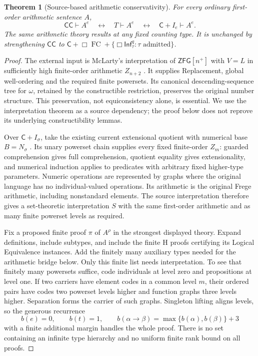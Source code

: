 \documentclass[11pt]{article}
\newcommand{\C}{\mathsf C}
\newcommand{\CC}{\mathsf{CC}}
\newcommand{\Infq}{\mathsf{Inf}^{q}}
\newtheorem{theorem}[proposition]{Theorem}
\begin{document}
\begin{theorem}[Source-based arithmetic conservativity]\label{fullconservation}
For every ordinary first-order arithmetic sentence $A$,
\[
 \CC\vdash A^e\quad\longleftrightarrow\quad
 T\vdash A^e\quad\longleftrightarrow\quad
 \C+I_e\vdash A^e.
\]
The same arithmetic theory results at any fixed counting type. It is unchanged by strengthening $\CC$ to $\C+\Box\operatorname{FC}+\{\Box\Infq_\tau:\tau\text{ admitted}\}$.
\end{theorem}
\begin{proof}
The external input is McLarty's interpretation of $\mathsf{ZFG}[n^+]$ with $V=L$ in sufficiently high finite-order arithmetic $Z_{n+2}$ \cite[\S\S2--5, pp.~2--6]{mclarty}. It supplies Replacement, global well-ordering and the required finite powersets. Its canonical descending-sequence tree for $\omega$, retained by the constructible restriction, preserves the original number structure. This preservation, not equiconsistency alone, is essential. We use the interpretation theorem as a source dependency; the proof below does not reprove its underlying constructibility lemmas.

Over $\C+I_\sigma$, take the existing current extensional quotient with numerical base $B=N_\sigma$ \cite[\S\S29,32.1,33.1]{coding}. Its unary powerset chain supplies every fixed finite-order $Z_m$: guarded comprehension gives full comprehension, quotient equality gives extensionality, and numerical induction applies to predicates with arbitrary fixed higher-type parameters. Numeric operations are represented by graphs where the original language has no individual-valued operations. Its arithmetic is the original Frege arithmetic, including nonstandard elements. The source interpretation therefore gives a set-theoretic interpretation $S$ with the same first-order arithmetic and as many finite powerset levels as required.

Fix a proposed finite proof $\pi$ of $A^\rho$ in the strongest displayed theory. Expand definitions, include subtypes, and include the finite H proofs certifying its Logical Equivalence instances. Add the finitely many auxiliary types needed for the arithmetic bridge below. Only this finite list needs interpretation. To see that finitely many powersets suffice, code individuals at level zero and propositions at level one. If two carriers have element codes in a common level $m$, their ordered pairs have codes two powerset levels higher and function graphs three levels higher. Separation forms the carrier of such graphs. Singleton lifting aligns levels, so the generous recurrence
\[
 b(e)=0,\qquad b(t)=1,\qquad
 b(\alpha\to\beta)=\max\{b(\alpha),b(\beta)\}+3
\]
with a finite additional margin handles the whole proof. There is no set containing an infinite type hierarchy and no uniform finite rank bound on all proofs.


\end{proof}
\end{document}
